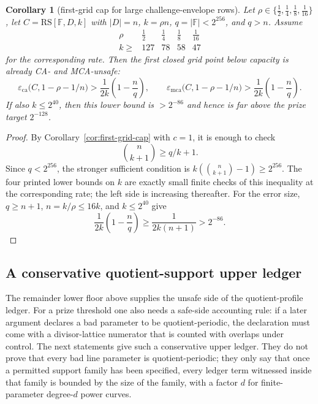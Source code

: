 \documentclass[11pt]{article}
\newtheorem{corollary}[corollary]{Corollary}
\theoremstyle{definition}
\theoremstyle{remark}
\newcommand{\F}{\mathbb{F}}
\newcommand{\RS}{\mathrm{RS}}
\newcommand{\eca}{\varepsilon_{\mathrm{ca}}}
\newcommand{\emca}{\varepsilon_{\mathrm{mca}}}
\begin{document}
\begin{corollary}[first-grid cap for large challenge-envelope rows]
\label{cor:first-grid-grand}
Let $\rho\in\{\frac12,\frac14,\frac18,\frac1{16}\}$, let
$C=\RS[\F,D,k]$ with $|D|=n$, $k=\rho n$, $q=|\F|<2^{256}$, and
$q>n$.  Assume
\[
\begin{array}{c|cccc}
\rho & \frac12 & \frac14 & \frac18 & \frac1{16}\\ \hline
k\ge & 127 & 78 & 58 & 47
\end{array}
\]
for the corresponding rate.  Then the first closed grid point below capacity is
already CA- and MCA-unsafe:
\[
        \eca\bigl(C,1-\rho-1/n\bigr)
        >\frac1{2k}\left(1-\frac nq\right),
        \qquad
        \emca\bigl(C,1-\rho-1/n\bigr)
        >\frac1{2k}\left(1-\frac nq\right).
\]
If also $k\le2^{40}$, then this lower bound is $>2^{-86}$ and hence is far
above the prize target $2^{-128}$.
\end{corollary}

\begin{proof}
By Corollary~\ref{cor:first-grid-cap} with $c=1$, it is enough to check
\[
        \binom n{k+1}\ge q/k+1.
\]
Since $q<2^{256}$, the stronger sufficient condition is
$k(\binom n{k+1}-1)\ge2^{256}$.  The four printed lower bounds on $k$ are exactly
small finite checks of this inequality at the corresponding rate; the left side
is increasing thereafter.  For the error size, $q\ge n+1$, $n=k/\rho\le16k$,
and $k\le2^{40}$ give
\[
        \frac1{2k}\left(1-\frac nq\right)
        \ge \frac1{2k(n+1)}
        >2^{-86}.
\]
\end{proof}


\subsection{A conservative quotient-support upper ledger}
\label{sec:quotient-support-upper}

The remainder lower floor above supplies the unsafe side of the quotient-profile
ledger.  For a prize threshold one also needs a safe-side accounting rule: if a
later argument declares a bad parameter to be quotient-periodic, the declaration
must come with a divisor-lattice numerator that is counted with overlaps under
control.  The next statements give such a conservative upper ledger.  They do
not prove that every bad line parameter is quotient-periodic; they only say that
once a permitted support family has been specified, every ledger term witnessed
inside that family is bounded by the size of the family, with a factor $d$ for
finite-parameter degree-$d$ power curves.
\end{document}
